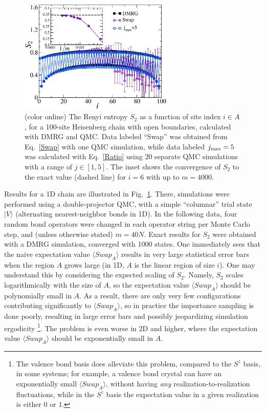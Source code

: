 \documentclass[prl,aps,twocolumn,floatfix,amsmath,amssymb,superscriptaddress,tightenlines]{revtex4}
\begin{document}
\begin{figure} {
\includegraphics[width=2.9in]{L100_fig2.eps} \caption{(color online) 
\label{1Dfig}
The Renyi entropy $S_2$ as a function of site index $i \in A$, for a 100-site Heisenberg chain with open boundaries, 
calculated with DMRG and QMC.  Data labeled ``Swap'' was obtained from Eq.~\eqref{Swap} with one QMC simulation, while
data labeled $j_{\rm max}=5$ was calculated with Eq.~\eqref{Ratio} using 20 separate QMC simulations with a range of  $j \in [1,5]$.  The inset shows the convergence of $S_2$ to the exact value (dashed line) for $i=6$ with up to $m=4000$.
}
} \end{figure}

Results for a 1D chain are illustrated in Fig.~\ref{1Dfig}.  There, simulations were performed using a double-projector QMC,  with a
simple ``columnar'' trial state $| V \rangle$ (alternating nearest-neighbor bonds in 1D).  In the following data, four random bond operators were changed in each operator string per Monte Carlo step, and (unless otherwise
stated) $m=40N$.  Exact results for $S_2$ were obtained with a DMRG simulation, converged with 1000 states.  
One 
immediately sees that the naive expectation value $\langle Swap_A \rangle$ 
results in very large statistical error bars 
when the region
$A$ grows large (in 1D, $A$ is the linear region of size $i$).  
One may understand this by considering the expected scaling of $S_2$.  Namely,
$S_2$ scales logarithmically with the size of $A$, so the expectation value
$\langle Swap_A \rangle$ should be polynomially small in $A$.  As a result, there
are only very
few configurations contributing significantly to $\langle Swap_A \rangle$, so in practice the importance sampling is done poorly,
resulting in large error bars and possibly jeopardizing simulation ergodicity \footnote{The valence bond basis does alleviate this problem, compared to the
$S^z$ basis, in some systems; for example, a valence
bond crystal can have an exponentially small $\langle Swap_A \rangle$, without having {\it any} realization-to-realization fluctuations,
while in the $S^z$ basis the expectation value  in a given realization is either $0$ or $1$.}.
The problem is even worse in 2D and higher, where the expectation value 
$\langle Swap_A \rangle$ should be exponentially small in $A$.
\end{document}
